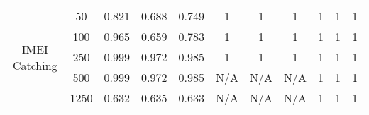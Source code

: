 \begin{table*}[]
{\begin{tabular}{ccccccccccc}
			\multicolumn{1}{|c|}{\multirow{6}{*}{IMEI Catching}}              & \multicolumn{1}{c|}{50}            & \multicolumn{1}{c|}{0.821}                   & \multicolumn{1}{c|}{0.688}                & \multicolumn{1}{c|}{0.749}            & \multicolumn{1}{c|}{1}                      & \multicolumn{1}{c|}{1}                   & \multicolumn{1}{c|}{1}               & \multicolumn{1}{c|}{1}                      & \multicolumn{1}{c|}{1}                   & \multicolumn{1}{c|}{1}               \\ \cline{2-11}
			\multicolumn{1}{|c|}{}                                            & \multicolumn{1}{c|}{100}           & \multicolumn{1}{c|}{0.965}                   & \multicolumn{1}{c|}{0.659}                & \multicolumn{1}{c|}{0.783}            & \multicolumn{1}{c|}{1}                        & \multicolumn{1}{c|}{1}                     & \multicolumn{1}{c|}{1}                 & \multicolumn{1}{c|}{1}                      & \multicolumn{1}{c|}{1}                   & \multicolumn{1}{c|}{1}               \\ \cline{2-11}
			\multicolumn{1}{|c|}{}                                            & \multicolumn{1}{c|}{250}           & \multicolumn{1}{c|}{0.999}                   & \multicolumn{1}{c|}{0.972}                & \multicolumn{1}{c|}{0.985}            & \multicolumn{1}{c|}{1}                        & \multicolumn{1}{c|}{1}                     & \multicolumn{1}{c|}{1}                 & \multicolumn{1}{c|}{1}                      & \multicolumn{1}{c|}{1}                   & \multicolumn{1}{c|}{1}               \\ \cline{2-11}
			\multicolumn{1}{|c|}{}                                            & \multicolumn{1}{c|}{500}           & \multicolumn{1}{c|}{0.999}                   & \multicolumn{1}{c|}{0.972}                & \multicolumn{1}{c|}{0.985}            & \multicolumn{1}{c|}{N/A}                      & \multicolumn{1}{c|}{N/A}                   & \multicolumn{1}{c|}{N/A}               & \multicolumn{1}{c|}{1}                      & \multicolumn{1}{c|}{1}                   & \multicolumn{1}{c|}{1}               \\ \cline{2-11}
			\multicolumn{1}{|c|}{}                                            & \multicolumn{1}{c|}{1250}          & \multicolumn{1}{c|}{0.632}                   & \multicolumn{1}{c|}{0.635}                & \multicolumn{1}{c|}{0.633}            & \multicolumn{1}{c|}{N/A}                        & \multicolumn{1}{c|}{N/A}                     & \multicolumn{1}{c|}{N/A}                 & \multicolumn{1}{c|}{1}                      & \multicolumn{1}{c|}{1}                   & \multicolumn{1}{c|}{1}               \\ \cline{2-11}

\end{tabular}}
\end{table*}
